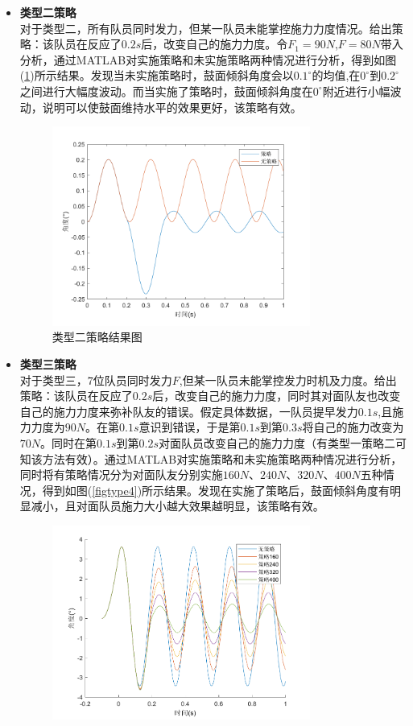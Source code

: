 \documentclass{cumcm}
\begin{document}
\begin{itemize}
\item \textbf{类型二策略}\\
对于类型二，所有队员同时发力，但某一队员未能掌控施力力度情况。给出策略：该队员在反应了$0.2s$后，改变自己的施力力度。令$F_1=90N$,$F=80N$带入分析，通过MATLAB对实施策略和未实施策略两种情况进行分析，得到如图(\ref{figtype3})所示结果。发现当未实施策略时，鼓面倾斜角度会以$0.1^{\circ}$的均值,在$0^{\circ}$到$0.2^{\circ}$之间进行大幅度波动。而当实施了策略时，鼓面倾斜角度在$0^{\circ}$附近进行小幅波动，说明可以使鼓面维持水平的效果更好，该策略有效。

\begin{figure}[H]
\centering
\includegraphics[width=0.8\textwidth]{img/type3.pdf}
\caption{类型二策略结果图}
\label{figtype3}
\end{figure}
\item \textbf{类型三策略}\\
对于类型三，$7$位队员同时发力$F$,但某一队员未能掌控发力时机及力度。给出策略：该队员在反应了$0.2s$后，改变自己的施力力度，同时其对面队友也改变自己的施力力度来弥补队友的错误。假定具体数据，一队员提早发力$0.1s$,且施力力度为$90N$。在第$0.1s$意识到错误，于是第$0.1s$到第$0.3s$将自己的施力改变为$70N$。同时在第$0.1s$到第$0.2s$对面队员改变自己的施力力度（有类型一策略二可知该方法有效）。通过MATLAB对实施策略和未实施策略两种情况进行分析，同时将有策略情况分为对面队友分别实施$160N$、$240N$、$320N$、$400N$五种情况，得到如图(\ref{figtype4})所示结果。发现在实施了策略后，鼓面倾斜角度有明显减小，且对面队员施力大小越大效果越明显，该策略有效。
\begin{figure}[H]
\centering
\includegraphics[width=0.8\textwidth]{img/type4.pdf}

\end{figure}
\end{itemize}
\end{document}
